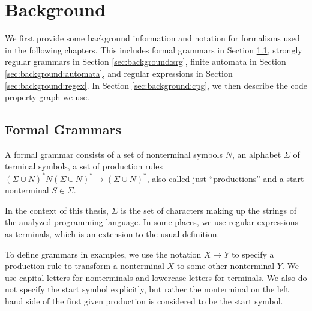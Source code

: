\chapter{Background}
\label{chapter:Background}
\begin{comment}
What is the knowledge a undergrad student needs so that he/she can understand
your thesis? You can assume some familiarity with the very broad topic. E.g. if
you write a thesis in the area of software analysis, you do not have to explain
static/dynamic analysis as such (this is boring!). If you're a crypto guy, don't
explain AES in detail unless you try to break it in your thesis. If I stumble
across a word/term in your thesis and don't understand it, this is where I would
look it up (or on google).

Probably approx. 3-10 pages
\end{comment}

We first provide some background information and notation for formalisms used in the following chapters. This includes formal grammars in Section \ref{sec:background:grammars}, strongly regular grammars in Section \ref{sec:background:srg}, finite automata in Section \ref{sec:background:automata}, and regular expressions in Section \ref{sec:background:regex}. In Section \ref{sec:background:cpg}, we then describe the code property graph we use.

\section{Formal Grammars}\label{sec:background:grammars}

A formal grammar consists of a set of nonterminal symbols $N$, an alphabet $\Sigma$ of terminal symbols, a set of production rules $(\Sigma \cup N)^*N(\Sigma \cup N)^* \rightarrow (\Sigma \cup N)^*$, also called just \enquote{productions} and a start nonterminal $S \in \Sigma$.

In the context of this thesis, $\Sigma$ is the set of characters making up the strings of the analyzed programming language. In some places, we use regular expressions as terminals, which is an extension to the usual definition.

To define grammars in examples, we use the notation $X \rightarrow Y$ to specify a production rule to transform a nonterminal $X$ to some other nonterminal $Y$.
We use capital letters for nonterminals and lowercase letters for terminals. We also do not specify the start symbol explicitly, but rather the nonterminal on the left hand side of the first given production is considered to be the start symbol.

